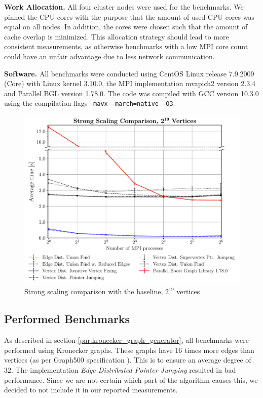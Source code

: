 \documentclass[letterpaper]{article}
\newcommand{\mypar}[1]{{\bf #1.}}
\begin{document}
\mypar{Work Allocation}
All four cluster nodes were used for the benchmarks. We pinned the CPU cores with the purpose that the amount of used
CPU cores was equal on all nodes. In addition, the cores were chosen such that the amount of cache overlap is minimized.
This allocation strategy should lead to more consistent measurements, as otherwise benchmarks with a low MPI core count
could have an unfair advantage due to less network communication.

\mypar{Software}
All benchmarks were conducted using CentOS Linux release 7.9.2009 (Core) with Linux kernel 3.10.0, the MPI
implementation mvapich2 version 2.3.4 and Parallel BGL version 1.78.0. The code was compiled with GCC version 10.3.0
using the compilation flags
\lstinline[basicstyle=\ttfamily\color{black},identifierstyle=\color{black}]|-mavx -march=native -O3|.

\begin{figure}
  \includegraphics[width=\columnwidth]{../benchmark-results/plots/strongscaling_s19.pdf}
  \caption{Strong scaling comparison with the baseline, $2^{19}$ vertices}
  \label{fig:strongscaling-19}
\end{figure}

\subsection{Performed Benchmarks}
As described in section \ref{par:kronecker_graph_generator}, all benchmarks were performed using Kronecker graphs. These
graphs have $16$ times more edges than vertices (as per Graph500 specification \cite{graph500}). This is to ensure an
average degree of $32$. The implementation \emph{Edge Distributed Pointer Jumping} resulted in bad performance.
Since we are not certain which part of the algorithm causes this, we decided to not include it in our reported
measurements.
\end{document}
